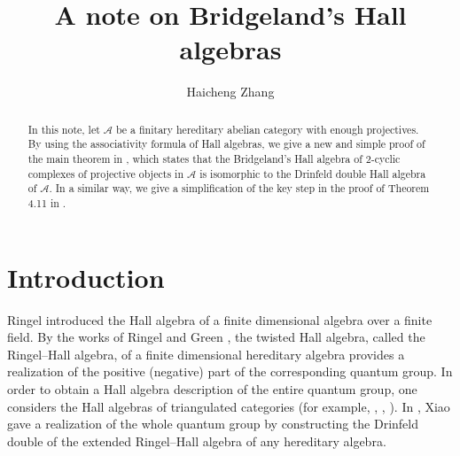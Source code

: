 \documentclass[reqno,12pt]{amsart}
\numberwithin{equation}{section}
\def\A{{\mathcal A}}\def\P{{\mathscr{P}}}
\theoremstyle{plain} %
\theoremstyle{definition} %
\begin{document}
\title[A note on Bridgeland's Hall algebras]{A note on Bridgeland's Hall algebras} %

\author[Haicheng Zhang]{{Haicheng Zhang}} %





%
\address{%
Yau Mathematical Sciences Center, Tsinghua University,
 Beijing 100084, P. R. China\endgraf
}






\begin{abstract}
In this note, let $\A$ be a finitary hereditary abelian category with enough projectives. By using the associativity formula of Hall algebras, we give a new and simple proof of the main theorem in \cite{Yan}, which states that the Bridgeland's Hall algebra of 2-cyclic complexes of projective objects in $\A$ is isomorphic to the Drinfeld double Hall algebra of $\A$. In a similar way, we give a simplification of the key step in the proof of Theorem 4.11 in \cite{LP}.
\end{abstract}
\maketitle
\section{Introduction}
Ringel \cite{R90a} introduced the Hall algebra of a finite dimensional algebra over a finite field.
By the works of Ringel \cite{R90a,R92a,R95} and Green \cite{Gr95}, the twisted Hall algebra, called the Ringel--Hall algebra, of a finite dimensional hereditary algebra provides a realization of the positive (negative) part of the corresponding quantum group.
In order to obtain a Hall algebra description of the entire quantum group, one considers the Hall algebras of triangulated categories (for example, \cite{Kapranov}, \cite{Toen}, \cite{XiaoXu}). In \cite{Xiao}, Xiao gave a realization of the whole quantum group by constructing the Drinfeld double of the extended Ringel--Hall algebra of any hereditary algebra.
\end{document}
